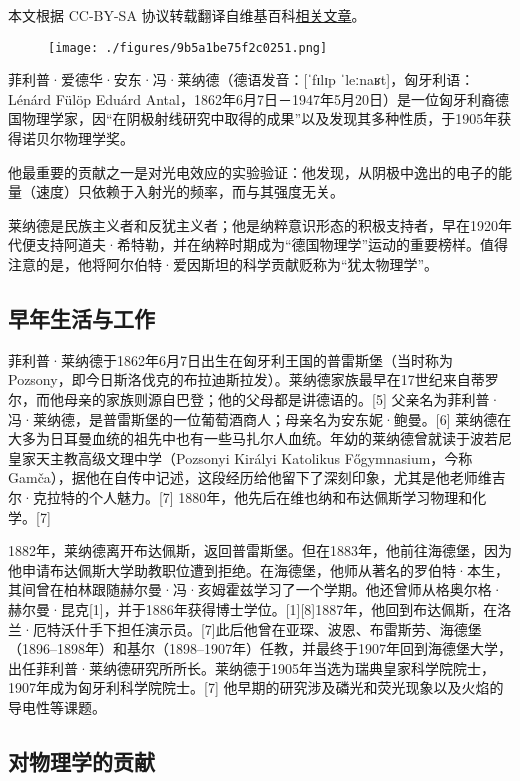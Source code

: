 
本文根据 CC-BY-SA 协议转载翻译自维基百科\href{https://en.wikipedia.org/wiki/Philipp_Lenard}{相关文章}。

\begin{figure}[ht]
\centering
\texttt{[image: ./figures/9b5a1be75f2c0251.png]}
\caption{} \label{fig_FLPL_3}
\end{figure}
菲利普·爱德华·安东·冯·莱纳德（德语发音：[ˈfɪlɪp ˈleːnaʁt]，匈牙利语：Lénárd Fülöp Eduárd Antal，1862年6月7日－1947年5月20日）是一位匈牙利裔德国物理学家，因“在阴极射线研究中取得的成果”以及发现其多种性质，于1905年获得诺贝尔物理学奖。

他最重要的贡献之一是对光电效应的实验验证：他发现，从阴极中逸出的电子的能量（速度）只依赖于入射光的频率，而与其强度无关。

莱纳德是民族主义者和反犹主义者；他是纳粹意识形态的积极支持者，早在1920年代便支持阿道夫·希特勒，并在纳粹时期成为“德国物理学”运动的重要榜样。值得注意的是，他将阿尔伯特·爱因斯坦的科学贡献贬称为“犹太物理学”。

\subsection{早年生活与工作}
菲利普·莱纳德于1862年6月7日出生在匈牙利王国的普雷斯堡（当时称为 Pozsony，即今日斯洛伐克的布拉迪斯拉发）。莱纳德家族最早在17世纪来自蒂罗尔，而他母亲的家族则源自巴登；他的父母都是讲德语的。[5] 父亲名为菲利普·冯·莱纳德，是普雷斯堡的一位葡萄酒商人；母亲名为安东妮·鲍曼。[6] 莱纳德在大多为日耳曼血统的祖先中也有一些马扎尔人血统。年幼的莱纳德曾就读于波若尼皇家天主教高级文理中学（Pozsonyi Királyi Katolikus Főgymnasium，今称 Gamča），据他在自传中记述，这段经历给他留下了深刻印象，尤其是他老师维吉尔·克拉特的个人魅力。[7]
1880年，他先后在维也纳和布达佩斯学习物理和化学。[7]

1882年，莱纳德离开布达佩斯，返回普雷斯堡。但在1883年，他前往海德堡，因为他申请布达佩斯大学助教职位遭到拒绝。在海德堡，他师从著名的罗伯特·本生，其间曾在柏林跟随赫尔曼·冯·亥姆霍兹学习了一个学期。他还曾师从格奥尔格·赫尔曼·昆克[1]，并于1886年获得博士学位。[1][8]1887年，他回到布达佩斯，在洛兰·厄特沃什手下担任演示员。[7]此后他曾在亚琛、波恩、布雷斯劳、海德堡（1896–1898年）和基尔（1898–1907年）任教，并最终于1907年回到海德堡大学，出任菲利普·莱纳德研究所所长。莱纳德于1905年当选为瑞典皇家科学院院士，1907年成为匈牙利科学院院士。[7] 他早期的研究涉及磷光和荧光现象以及火焰的导电性等课题。
\subsection{对物理学的贡献}
